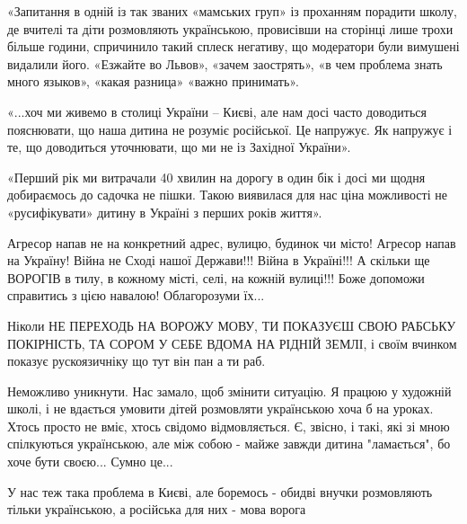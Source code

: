 «Запитання в одній із так званих «мамських груп» із проханням порадити школу,
де вчителі та діти розмовляють українською, провисівши на сторінці лише трохи
більше години, спричинило такий сплеск негативу, що модератори були вимушені
видалили його. «Езжайте во Львов», «зачем заострять», «в чем проблема знать
много языков», «какая разница» «важно принимать». 

«...хоч ми живемо в столиці України – Києві, але нам досі часто доводиться
пояснювати, що наша дитина не розуміє російської. Це напружує. Як напружує і
те, що доводиться уточнювати, що ми не із Західної України». 

«Перший рік ми витрачали 40 хвилин на дорогу в один бік і досі ми щодня
добираємось до садочка не пішки. Такою виявилася для нас ціна можливості не
«русифікувати» дитину в Україні з перших років життя».

\begin{cmtfront}
\large
{}

Агресор напав не на конкретний адрес, вулицю, будинок чи місто! Агресор напав
на Україну!  Війна не Сході нашої Держави!!! Війна в Україні!!! А скільки ще
ВОРОГІВ в тилу, в кожному місті, селі, на кожній вулиці!!!  Боже допоможи
справитись з цією навалою!  Облагорозуми їх...


Ніколи НЕ ПЕРЕХОДЬ НА ВОРОЖУ МОВУ, ТИ ПОКАЗУЄШ СВОЮ РАБСЬКУ ПОКІРНІСТЬ, ТА
СОРОМ У СЕБЕ ВДОМА НА РІДНІЙ ЗЕМЛІ, і своїм вчинком показує рускоязичніку що
тут він пан а ти раб.


Неможливо уникнути. Нас замало, щоб змінити ситуацію. Я працюю у художній
школі, і не вдається умовити дітей розмовляти українською хоча б на уроках.
Хтось просто не вміє, хтось свідомо відмовляється. Є, звісно, і такі, які зі
мною спілкуються українською, але між собою - майже завжди дитина "ламається",
бо хоче бути своєю... Сумно це...


У нас теж така проблема в Києві, але боремось - обидві внучки розмовляють
тільки українською, а російська для них - мова ворога

\end{cmtfront}

